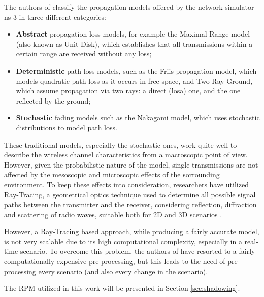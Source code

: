 \begin{enumerate}
		
		The authors of \cite{6298165} classify the propagation models offered by the network simulator ns-3 in three different categories:
		\begin{itemize}
			\item \textbf{Abstract} propagation loss models, for example the Maximal Range model (also known as Unit Disk), which establishes that all transmissions within a certain range are received without any loss;
			\item \textbf{Deterministic} path loss models, such as the Friis propagation model, which models quadratic path loss as it occurs in free space, and Two Ray Ground, which assume propagation via two rays: a direct (\acrshort{losa}) one, and the one reflected by the ground;
			\item \textbf{Stochastic} fading models such as the Nakagami model, which uses stochastic distributions to model path loss.
		\end{itemize}
	
	
		These traditional models, especially the stochastic ones, work quite well to describe the wireless channel characteristics from a macroscopic point of view. However, given the probabilistic nature of the model, single transmissions are not affected by the mesoscopic and microscopic effects of the sorrounding environment. To keep these effects into consideration, researchers have utilized Ray-Tracing, a geometrical optics technique used to determine all possible signal paths between the transmitter and the receiver, considering reflection, diffraction and scattering of radio waves, suitable both for 2D and 3D scenarios \cite{245274} \cite{765022}.
		
		
		However, a Ray-Tracing based approach, while producing a fairly accurate model, is not very scalable due to its high computational complexity, especially in a real-time scenario. To overcome this problem, the authors of \cite{STEPANOV200861} have resorted to a fairly computationally expensive pre-processing, but this leads to the need of pre-processing every scenario (and also every change in the scenario).
		
		
		The RPM utilized in this work will be presented in Section \ref{sec:shadowing}.
	
		
		
		\end{enumerate}